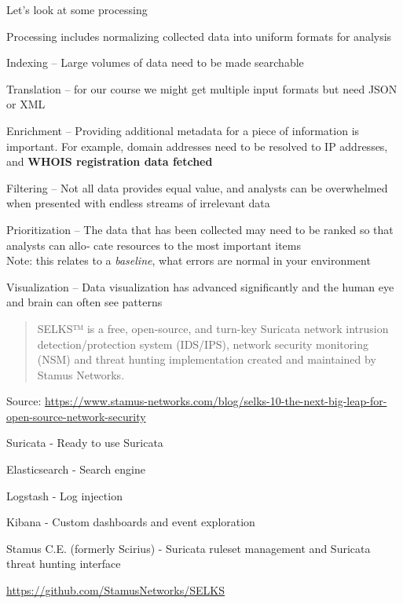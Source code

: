 \documentclass[Screen16to9,17pt]{foils}
\begin{document}




Let's look at some processing

\begin{list2}
\item Processing includes normalizing collected data into uniform formats for analysis
\item Indexing -- Large volumes of data need to be made searchable
\item Translation -- for our course we might get multiple input formats but need JSON or XML
\item Enrichment -- Providing additional metadata for a piece of information is important. For example, domain addresses need to be resolved to IP addresses, and {\bf WHOIS registration data fetched}
\item Filtering --
Not all data provides equal value, and analysts can be overwhelmed when presented with endless streams of irrelevant data
\item Prioritization --
The data that has been collected may need to be ranked so that analysts can allo‐
cate resources to the most important items\\
Note: this relates to a \emph{baseline}, what errors are normal in your environment
\item Visualization -- Data visualization has advanced significantly and the human eye and brain can often see patterns
\end{list2}




\begin{quote}
SELKS™ is a free, open-source, and turn-key Suricata network intrusion detection/protection system (IDS/IPS), network security monitoring (NSM) and threat hunting implementation created and maintained by Stamus Networks.
\end{quote}
Source: \url{https://www.stamus-networks.com/blog/selks-10-the-next-big-leap-for-open-source-network-security}

\begin{list2}
\item Suricata - Ready to use Suricata
\item Elasticsearch - Search engine
\item Logstash - Log injection
\item Kibana - Custom dashboards and event exploration
\item Stamus C.E. (formerly Scirius) - Suricata ruleset management and Suricata threat hunting interface
\end{list2}
\url{https://github.com/StamusNetworks/SELKS}
\end{document}
